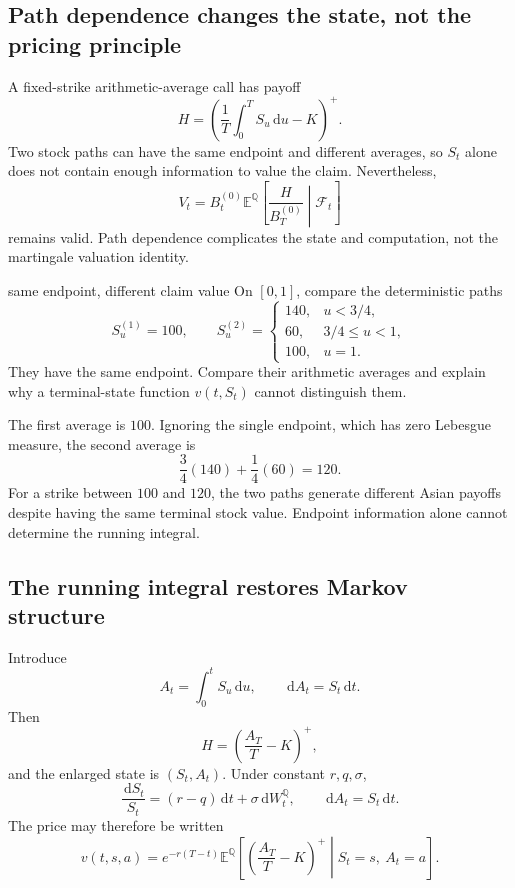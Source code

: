 \documentclass[10pt]{article}
\newcommand{\E}{\mathbb E}
\newcommand{\Q}{\mathbb Q}
\newcommand{\1}{\mathbf 1}
\newcommand{\cF}{\mathcal F}
\newcommand{\dd}{\,\mathrm d}
\theoremstyle{definition}
\begin{document}
\subsection{Path dependence changes the state, not the pricing principle}

A fixed-strike arithmetic-average call has payoff
\[
H=\left(\frac1T\int_0^TS_u\dd u-K\right)^+.
\]
Two stock paths can have the same endpoint and different averages, so
\(S_t\) alone does not contain enough information to value the claim.
Nevertheless,
\[
\boxed{
V_t=B_t^{(0)}
\E^\Q\left[\frac{H}{B_T^{(0)}}\middle|\cF_t\right]}
\]
remains valid. Path dependence complicates the state and computation, not
the martingale valuation identity.

\begin{studentexercise}{same endpoint, different claim value}
On \([0,1]\), compare the deterministic paths
\[
S_u^{(1)}=100,
\qquad
S_u^{(2)}=
\begin{cases}
140,&u<3/4,\\
60,&3/4\leq u<1,\\
100,&u=1.
\end{cases}
\]
They have the same endpoint. Compare their arithmetic averages and explain
why a terminal-state function \(v(t,S_t)\) cannot distinguish them.
\end{studentexercise}
\begin{shortsolution}
The first average is \(100\). Ignoring the single endpoint, which has zero
Lebesgue measure, the second average is
\[
\frac34(140)+\frac14(60)=120.
\]
For a strike between \(100\) and \(120\), the two paths generate different
Asian payoffs despite having the same terminal stock value. Endpoint
information alone cannot determine the running integral.
\end{shortsolution}

\subsection{The running integral restores Markov structure}

Introduce
\[
\boxed{A_t=\int_0^tS_u\dd u,\qquad \dd A_t=S_t\dd t.}
\]
Then
\[
H=\left(\frac{A_T}{T}-K\right)^+,
\]
and the enlarged state is \((S_t,A_t)\). Under constant \(r,q,\sigma\),
\[
\frac{\dd S_t}{S_t}=(r-q)\dd t+\sigma\dd W_t^\Q,
\qquad
\dd A_t=S_t\dd t.
\]
The price may therefore be written
\[
v(t,s,a)
=e^{-r(T-t)}
\E^\Q\left[
\left(\frac{A_T}{T}-K\right)^+
\middle|S_t=s,\ A_t=a
\right].
\]
\end{document}
